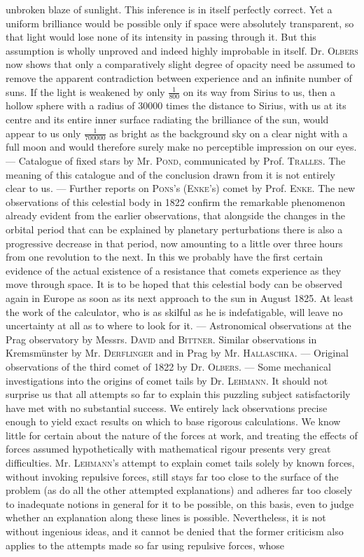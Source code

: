 unbroken blaze of sunlight. This inference is in itself perfectly correct. Yet a uniform brilliance would be possible only if space were absolutely transparent, so that light would lose none of its intensity in passing through it. But this assumption is wholly unproved and indeed highly improbable in itself. Dr. \textsc{Olbers} now shows that only a  comparatively slight degree of opacity need be assumed to remove the apparent contradiction between experience and an infinite number of suns. If the light is weakened by only $\frac{1}{800}$ on its way from Sirius to us, then a hollow sphere with a radius of 30000 times the distance to Sirius, with us at its centre and its entire inner surface radiating the brilliance of the sun, would appear to us only $\frac{1}{700000}$ as bright as the background sky on a clear night with a full moon and would therefore surely make no perceptible impression on our eyes. --- Catalogue of fixed stars by Mr. \textsc{Pond}, communicated by Prof. \textsc{Tralles}. The meaning of this catalogue and of the conclusion drawn from it is not entirely clear to us. --- Further reports on \textsc{Pons}'s (\textsc{Enke}'s) comet by Prof. \textsc{Enke}. The new observations of this celestial body in 1822 confirm the remarkable phenomenon already evident from the earlier observations, that alongside the changes in the orbital period that can be explained by planetary perturbations there is also a progressive decrease in that period, now amounting to a little over three hours from one revolution to the next. In this we probably have the first certain evidence of the actual existence of a resistance that comets experience as they move through space. It is to be hoped that this celestial body can be observed again in Europe as soon as its next approach to the sun in August 1825. At least the work of the calculator, who is as skilful as he is indefatigable, will leave no uncertainty at all as to where to look for it. --- Astronomical observations at the Prag observatory by Messrs. \textsc{David} and \textsc{Bittner}. Similar observations in Kremsmünster by Mr. \textsc{Derflinger} and in Prag by Mr. \textsc{Hallaschka}. --- Original observations of the third comet of 1822 by Dr. \textsc{Olbers}. --- Some mechanical investigations into the origins of comet tails by Dr. \textsc{Lehmann}. It should not surprise us that all attempts so far to explain this puzzling subject satisfactorily have met with no substantial success. We entirely lack observations precise enough to yield exact results on which to base rigorous calculations. We know little for certain about the nature of the forces at work, and treating the effects of forces assumed hypothetically with mathematical rigour presents very great difficulties. Mr. \textsc{Lehmann}'s attempt to explain comet tails solely by known forces, without invoking repulsive forces, still stays far too close to the surface of the problem (as do all the other attempted explanations) and adheres far too closely to inadequate notions in general for it to be possible, on this basis, even to judge whether an explanation along these lines is possible. Nevertheless, it is not without ingenious ideas, and it cannot be denied that the former criticism also applies to the attempts made so far using repulsive forces, whose 
